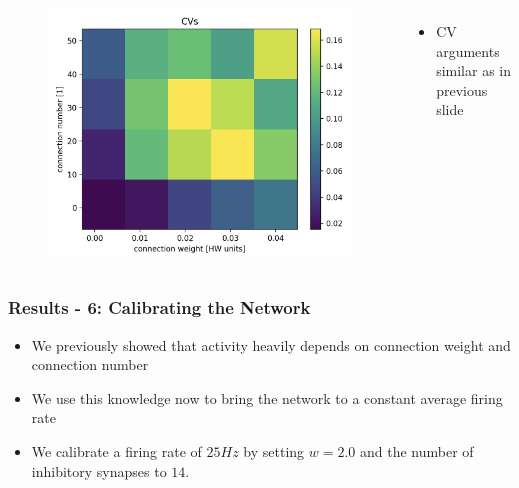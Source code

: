 \documentclass{beamer}
\begin{document}
\begin{frame}
\begin{columns}
          \begin{figure}
    				\centering
    				\includegraphics[width=\linewidth]{figures/CV_sweep.png}
 		   \end{figure}
 		   \begin{itemize}
          		\item CV arguments similar as in previous slide
          	\end{itemize}

	\end{columns}

\end{frame}

\begin{frame}
	\frametitle{Results - 6: Calibrating the Network}
	\begin{itemize}
		\item We previously showed that activity heavily depends on connection weight 
		and connection number
		\item We use this knowledge now to bring the network to a constant average 
		firing rate
		\item We calibrate a firing rate of $25Hz$ by setting $w=2.0$ and the number 
		of inhibitory synapses to $14$.
	\end{itemize}
\end{frame}
\end{document}
